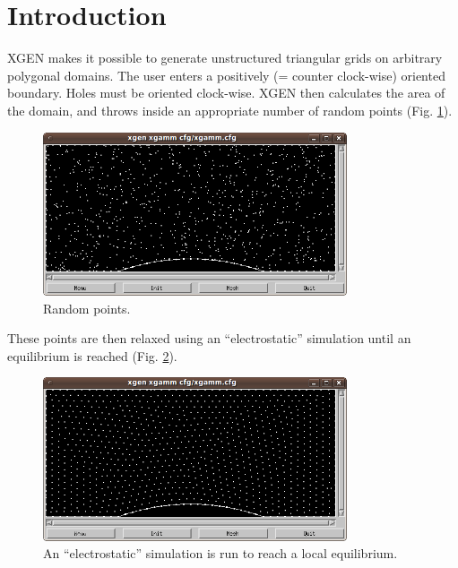 \documentclass[12pt]{article}
\begin{document}
  \section{Introduction}

  XGEN makes it possible to generate unstructured
  triangular grids on arbitrary polygonal domains. The user enters 
  a positively (= counter clock-wise) oriented boundary. Holes must 
  be oriented clock-wise. XGEN then calculates the area of the domain, and 
  throws inside an appropriate number of random points (Fig. \ref{fig:random}).

\newpage

  \begin{figure}[!ht]
  \begin{center}
  \includegraphics[width=0.8\textwidth]{xgen-4.png}
  \end{center}
  \vspace{-6mm}
  \caption{Random points.}
  \label{fig:random}
  \end{figure}
\noindent
These points are then relaxed using an ``electrostatic'' simulation
until an equilibrium is reached  (Fig. \ref{fig:equil}).

  \begin{figure}[!ht]
  \begin{center}
  \includegraphics[width=0.8\textwidth]{xgen-5.png}
  \end{center}
  \vspace{-6mm}
  \caption{An ``electrostatic'' simulation is run to reach a local equilibrium.}
  \label{fig:equil}
\vspace{-1cm}
  \end{figure}
\end{document}
